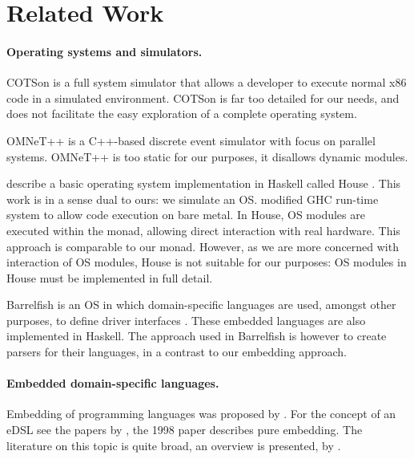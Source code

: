 \section{Related Work}
\label{sec:related-work}

\paragraph{Operating systems and simulators.}
COTSon \cite{cotson} is a full system simulator that allows a developer to execute normal x86 code in a simulated environment.
COTSon is far too detailed for our needs, and does not facilitate the easy exploration of a complete operating system.

OMNeT++ \cite{omnet} is a C++-based discrete event simulator with focus on parallel systems. OMNeT++ is too static for our purposes, it disallows dynamic modules.

\citeauthor{house} describe a basic operating system implementation in Haskell called House \cite{house}.
This work is in a sense dual to ours: we simulate an OS.
\citeauthor{house} modified GHC run-time system to allow code execution on bare metal.
In House, OS modules are executed within the  monad, allowing direct interaction with real hardware.
This approach is comparable to our  monad.
However, as we are more concerned with interaction of OS modules, House is not suitable for our purposes:  OS modules in House must be implemented in full detail.

Barrelfish \cite{Baumann:2009:MNO:1629575.1629579} is an OS in which domain-specific languages are used, amongst other purposes, to define driver interfaces \cite{barrelfish}.
These embedded languages are also implemented in Haskell.
The approach used in Barrelfish is however to create parsers for their languages, in a contrast to our embedding approach.


\paragraph{Embedded domain-specific languages.}
Embedding of programming languages was proposed by \citeauthor{Landin:1966:NPL:365230.365257} \cite{Landin:1966:NPL:365230.365257}.
For the concept of an eDSL see the papers by \citeauthor{hudak1} \cite{hudak1,hudak2}, the 1998 paper describes pure embedding.
The literature on this topic is quite broad, an overview is presented, \eg by \citeauthor{dsl-survey} \cite{dsl-survey}.

